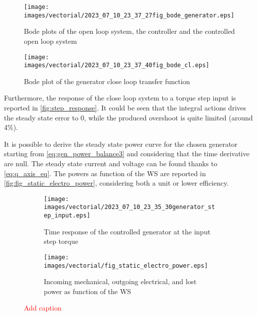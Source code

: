 \begin{figure}[htb]
    \centering
    \texttt{[image: images/vectorial/2023\_07\_10\_23\_37\_27fig\_bode\_generator.eps]}
    \caption{Bode plots of the open loop system, the controller and the controlled open loop system}
    \label{fig:fig_bode_generator}
 \end{figure}

 \begin{figure}[htb]
    \centering
    \texttt{[image: images/vectorial/2023\_07\_10\_23\_37\_40fig\_bode\_cl.eps]}
    \caption{Bode plot of the generator close loop transfer function}
    \label{fig:fig_bode_cl}
 \end{figure}

Furthermore, the response of the close loop system to a torque step input is reported in \autoref{fig:step_response}. It could be seen that the integral actions drives the steady state error to 0, while the produced overshoot is quite limited (around 4\%).

It is possible to derive the steady state power curve for the chosen generator starting from \autoref{eq:gen_power_balance3} and considering that the time derivative are null. The steady state current and voltage can be found thanks to \autoref{eq:q_axis_eq}. The powers as function of the \acrshort{WS} are reported in \autoref{fig:fig_static_electro_power}, considering both a unit or lower efficiency.
  \begin{figure}[htb]
    \begin{subfigure}{0.5\textwidth}
      \centering
      \texttt{[image: images/vectorial/2023\_07\_10\_23\_35\_30generator\_step\_input.eps]}
      \caption{Time response of the controlled generator at the input step torque}
      \label{fig:step_response}
    \end{subfigure}
    \begin{subfigure}{0.5\textwidth}
      \centering
      \texttt{[image: images/vectorial/fig\_static\_electro\_power.eps]}
      \caption{Incoming mechanical, outgoing electrical, and lost power as function of the WS}
      \label{fig:fig_static_electro_power}
    \end{subfigure}
    \caption{\textcolor{red}{Add caption}}
\end{figure}

